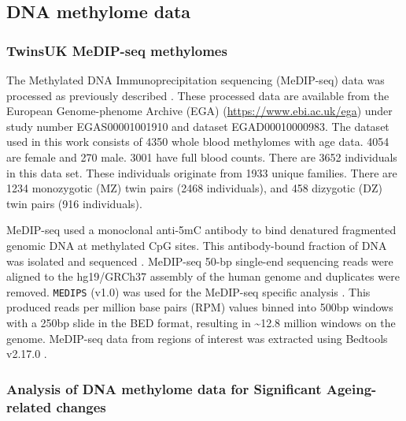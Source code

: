 \documentclass[]{book}
\begin{document}
\hypertarget{dna-methylome-data}{%
\subsection{DNA methylome data}\label{dna-methylome-data}}

\hypertarget{EpiTwinsMethods}{%
\subsubsection{TwinsUK MeDIP-seq methylomes}\label{EpiTwinsMethods}}

The Methylated DNA Immunoprecipitation sequencing (MeDIP-seq) data was processed as previously described \citep{Bell2016, Bell2017a}.
These processed data are available from the European Genome-phenome Archive (EGA) (\url{https://www.ebi.ac.uk/ega}) under study number EGAS00001001910 and dataset EGAD00010000983.
The dataset used in this work consists of 4350 whole blood methylomes with age data.
4054 are female and 270 male.
3001 have full blood counts.
There are 3652 individuals in this data set.
These individuals originate from 1933 unique families.
There are 1234 monozygotic (MZ) twin pairs (2468 individuals), and 458 dizygotic (DZ) twin pairs (916 individuals).

MeDIP-seq used a monoclonal anti-5mC antibody to bind denatured fragmented genomic DNA at methylated CpG sites.
This antibody-bound fraction of DNA was isolated and sequenced \citep{Down2009}.
MeDIP-seq 50-bp single-end sequencing reads were aligned to the hg19/GRCh37 assembly of the human genome and duplicates were removed.
\texttt{MEDIPS} (v1.0) was used for the MeDIP-seq specific analysis \citep{Lienhard2014}.
This produced reads per million base pairs (RPM) values binned into 500bp windows with a 250bp slide in the BED format, resulting in \textasciitilde12.8 million windows on the genome.
MeDIP-seq data from regions of interest was extracted using Bedtools v2.17.0 \citep{Quinlan2010}.

\hypertarget{medipmodels}{%
\subsubsection{Analysis of DNA methylome data for Significant Ageing-related changes}\label{medipmodels}}
\end{document}

